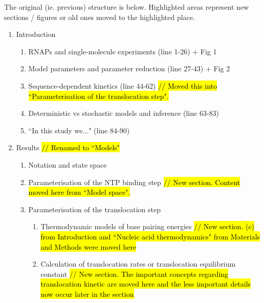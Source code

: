 \documentclass[12pt]{article}
\begin{document}
The original (ie. previous) structure is below. Highlighted areas represent new sections / figures or old ones moved to the highlighted place. \\


\begin{enumerate}

	\item Introduction
	\begin{enumerate}

		\item RNAPs and single-molecule experiments (line 1-26) + Fig 1 
		
		\item Model parameters and parameter reduction (line 27-43) + Fig 2 
		
		\item Sequence-dependent kinetics (line 44-62) \hl{// Moved this into ``Parameterisation of the translocation step".} 
		
		\item Deterministic vs stochastic models and inference (line 63-83)  
		
		\item ``In this study we..." (line 84-90)



	\end{enumerate}
	
	
	\item Results \hl{ // Renamed to ``Models" } 
	\begin{enumerate}



		\item Notation and state space 
		
		\item Parameterisation of the NTP binding step  \hl{ // New section. Content moved here from ``Model space". } 
	
		\item Parameterisation of the translocation step  
		\begin{enumerate}
	
			\item Thermodynamic models of base pairing energies \hl{ // New section. (c) from Introduction and ``Nucleic acid thermodynamics" from Materials and Methods were moved here} 
			
			\item Calculation of translocation rates or translocation equilibrium constant \hl{ // New section. The important concepts regarding translocation kinetic are moved here and the less important details now occur later in the section} 
	

\end{enumerate}
\end{enumerate}
\end{enumerate}
\end{document}
